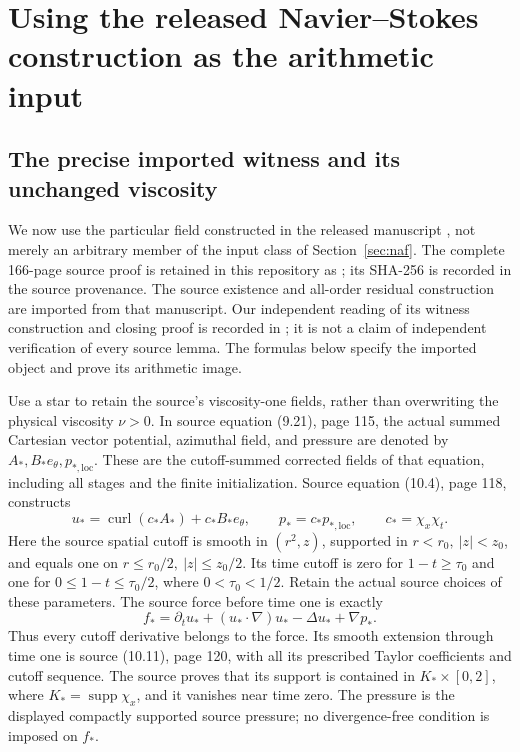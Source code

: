 \section*{Using the released Navier--Stokes construction as the arithmetic input}

\subsection*{The precise imported witness and its unchanged viscosity}

We now use the particular field constructed in the released manuscript
\cite{openaiNS2026}, not merely an arbitrary member of the input class
of Section~\ref{sec:naf}. The complete 166-page source proof is retained
in this repository as ;
its SHA-256 is recorded in the source provenance. The source existence
and all-order residual construction are imported from that manuscript.
Our independent reading of its witness construction and closing proof
is recorded in ; it is not a
claim of independent verification of every source lemma. The formulas
below specify the imported object and prove its arithmetic image.

Use a star to retain the source's viscosity-one fields, rather than
overwriting the physical viscosity $\nu>0$. In source equation (9.21),
page 115, the actual summed Cartesian vector potential, azimuthal field,
and pressure are denoted by $A_*,B_*e_\theta,p_{*,\mathrm{loc}}$.
These are the cutoff-summed corrected fields of that equation, including
all stages and the finite initialization. Source equation (10.4), page
118, constructs
\[
 u_* = \operatorname{curl}(c_*A_*)+c_*B_*e_\theta,
 \qquad p_*=c_*p_{*,\mathrm{loc}},\qquad c_*=\chi_x\chi_t.
\]
Here the source spatial cutoff is smooth in $(r^2,z)$, supported in
$r<r_0,\ |z|<z_0$, and equals one on
$r\leq r_0/2,\ |z|\leq z_0/2$. Its time cutoff is zero for
$1-t\geq\tau_0$ and one for $0\leq1-t\leq\tau_0/2$, where
$0<\tau_0<1/2$. Retain the actual source choices of these parameters.
The source force before time one is exactly
\[
 f_* = \partial_tu_*+(u_*\cdot\nabla)u_*
                     -\Delta u_*+\nabla p_*.
\]
Thus every cutoff derivative belongs to the force. Its smooth extension
through time one is source (10.11), page 120, with all its prescribed
Taylor coefficients and cutoff sequence. The source proves that its
support is contained in $K_*\times[0,2]$, where
$K_*=\operatorname{supp}\chi_x$, and it vanishes near time zero.
The pressure is the displayed compactly supported source pressure;
no divergence-free condition is imposed on $f_*$.

